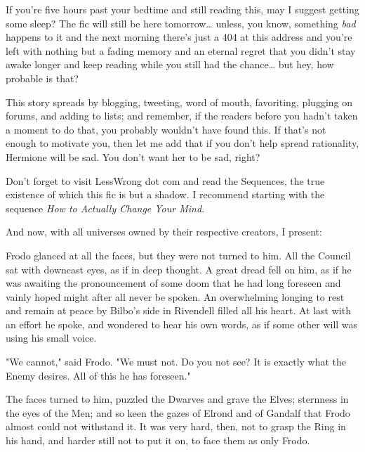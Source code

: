 
If you're five 
hours past your bedtime and still reading this, may I suggest getting some 
sleep? The fic will still be here tomorrow{\ldots} unless, you know, something 
\emph{bad} happens to it and the next morning there's just a 404 at this 
address and you're left with nothing but a fading memory and an eternal regret 
that you didn't stay awake longer and keep reading while you still had the 
chance{\ldots} but hey, how probable is that?

This story spreads by blogging, tweeting, word of mouth, favoriting, plugging 
on forums, and adding to lists; and remember, if the readers before you hadn't 
taken a moment to do that, you probably wouldn't have found this. If that's not 
enough to motivate you, then let me add that if you don't help spread 
rationality, Hermione will be sad. You don't want her to be sad, right?

Don't forget to visit LessWrong dot com and read the Sequences, the true 
existence of which this fic is but a shadow. I recommend starting with the 
sequence \emph{How to Actually Change Your Mind.}

And now, with all universes owned by their respective creators, I present:
\sbreak
{}

\noindent{}Frodo glanced at all the faces, but they were not turned to him. All the 
Council sat with downcast eyes, as if in deep thought. A great dread fell on 
him, as if he was awaiting the pronouncement of some doom that he had long 
foreseen and vainly hoped might after all never be spoken. An overwhelming 
longing to rest and remain at peace by Bilbo's side in Rivendell filled all his 
heart. At last with an effort he spoke, and wondered to hear his own words, as 
if some other will was using his small voice.

"We cannot," said Frodo. "We must not. Do you not see? It is exactly what the 
Enemy desires. All of this he has foreseen."

The faces turned to him, puzzled the Dwarves and grave the Elves; sternness in 
the eyes of the Men; and so keen the gazes of Elrond and of Gandalf that Frodo 
almost could not withstand it. It was very hard, then, not to grasp the Ring in 
his hand, and harder still not to put it on, to face them as only Frodo.

